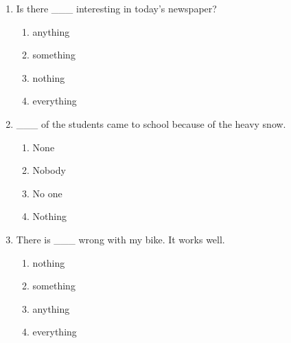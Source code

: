 \documentclass[11pt,a4paper]{ctexart}
\begin{document}
\begin{enumerate}[leftmargin=*,itemsep=4pt]
\begin{enumerate}[label=\Alph*.,leftmargin=2em,itemsep=1pt,topsep=2pt]
\item Anything
\item Everything
\end{enumerate}
\item Is there \_\_\_ interesting in today’s newspaper?
\begin{enumerate}[label=\Alph*.,leftmargin=2em,itemsep=1pt,topsep=2pt]
\item anything
\item something
\item nothing
\item everything
\end{enumerate}
\item \_\_\_ of the students came to school because of the heavy snow.
\begin{enumerate}[label=\Alph*.,leftmargin=2em,itemsep=1pt,topsep=2pt]
\item None
\item Nobody
\item No one
\item Nothing
\end{enumerate}
\item There is \_\_\_ wrong with my bike. It works well.
\begin{enumerate}[label=\Alph*.,leftmargin=2em,itemsep=1pt,topsep=2pt]
\item nothing
\item something
\item anything
\item everything
\end{enumerate}
\end{enumerate}
\end{document}
